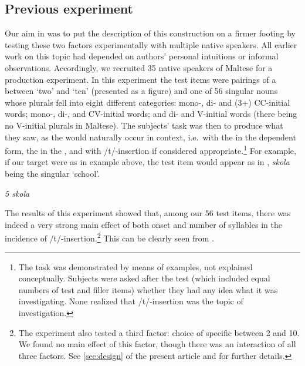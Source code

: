 \documentclass[output=paper]{langsci/langscibook}
\begin{document}
\subsection{Previous experiment}\label{sec:prevexp}
Our aim in \citet{LucasSpagnol2016} was to put the description of this construction on a firmer footing by testing these two factors experimentally with multiple native speakers. All earlier work on this topic had depended on authors’ personal intuitions or informal observations. Accordingly, we recruited 35 native speakers of Maltese for a production experiment. In this experiment the test items were pairings of a  between ‘two’ and ‘ten’ (presented as a figure) and one of 56 singular nouns whose plurals fell into eight different categories: mono-, di- and  (3+) CC-initial words; mono-, di-, and  CV-initial words; and di- and  V-initial words (there being no  V-initial plurals in Maltese). The subjects’ task was then to produce what they saw, as the  would naturally occur in context, i.e.~with the  in the dependent form, the  in the , and with /t/-insertion if considered appropriate.\footnote{The task was demonstrated by means of examples, not explained conceptually. Subjects were asked after the test (which included equal numbers of test and filler items) whether they had any idea what it was investigating. None realized that /t/-insertion was the topic of investigation.} For example, if our target were as in example  above, the test item would appear as in , \textit{skola} being the singular ‘school’.

\ea\label{ex:lucas:2}
\itshape 5   skola\\
\z


The results of this experiment showed that, among our 56 test items, there was indeed a very strong main effect of both onset and number of syllables in the incidence of /t/-insertion.\footnote{The experiment also tested a third factor: choice of specific  between 2 and 10. We found no main effect of this factor, though there was an interaction of all three factors. See \textsection\ref{sec:design} of the present article and \citet{LucasSpagnol2016} for further details.} This can be clearly seen from .
\end{document}
